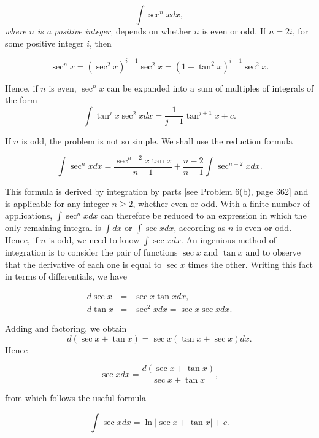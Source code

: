 \begin{equation}
\int \sec^{n}xdx,   
\label{eq7.2.5}
\end{equation}
\noindent \textit{where $n$ is a positive integer,} depends on whether $n$ is even or odd. 
If $n = 2i$, for some positive integer $i$, then

$$
\sec^{n}x = (\sec^{2}x)^{i-1} \sec^{2} x = (1 + \tan^{2}x)^{i-1} \sec^{2}x.
$$

\noindent Hence, if $n$ is even, $\sec^{n}x$ can be expanded into a sum of multiples of integrals of the form
$$
\int \tan^{j} x \sec^{2} x dx = \frac{1}{j + 1} \tan^{j + 1} x + c.
$$

\noindent If $n$ is odd, the problem is not so simple. We shall use the reduction formula


\begin{theorem} %
$$
\int \sec^{n} x dx = \frac{\sec^{n-2} x \tan x}{n - 1} + \frac{n - 2}{n - 1} \int \sec^{n-2} xdx.
$$
\end{theorem}

\noindent This formula is derived by integration by parts [see Problem 6(b), page 362] and is
applicable for any integer $n \geq 2$, whether even or odd. With a finite number of applications, $\int \sec^{n} x dx$ can therefore be reduced to an expression in which the only remaining integral is $\int dx$ or $\int \sec x dx$, according as $n$ is even or odd. Hence, if $n$ is odd, we need to know $\int \sec x dx$. An ingenious method of integration is to consider the pair of functions $\sec x$ and $\tan x$ and to observe that the derivative of each one is equal to $\sec x$ times the other. Writing this fact in terms of differentials, we have


\begin{eqnarray*}
d \sec x &=& \sec x \tan x dx,\\
d \tan x  &=& \sec^{2}x dx = \sec x \sec x dx. 
\end{eqnarray*}


\noindent Adding and factoring, we obtain
$$
d(\sec x + \tan x) = \sec x(\tan x + \sec x) dx.
$$
\noindent Hence

$$
\sec x dx = \frac{d(\sec x + \tan x)}{\sec x + \tan x},
$$ 

\noindent from which follows the useful formula

\begin{theorem} %
$$
\int \sec x dx = \ln |\sec x + \tan x| + c.
$$
\end{theorem}

